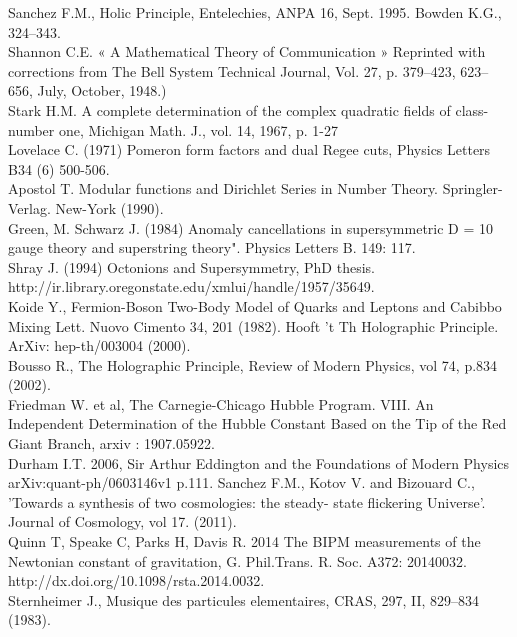 \documentclass[a4paper,9pt]{article}
\begin{document}
\begin{thebibliography}{99}
  Sanchez F.M., Holic Principle, Entelechies, ANPA 16, Sept. 1995. Bowden K.G., 324--343.\\
 Shannon C.E. « A Mathematical Theory of Communication » Reprinted with corrections from The Bell System Technical Journal, Vol. 27, p. 379–423, 623–656, July, October, 1948.)\\
 Stark H.M. A complete determination of the complex quadratic fields of class-number one, Michigan Math. J., vol. 14,‎ 1967, p. 1-27  \\
 Lovelace C. (1971) Pomeron form factors and dual Regee cuts, Physics Letters B34 (6) 500-506.\\
 Apostol T. Modular functions and Dirichlet Series in Number Theory. Springler-Verlag. New-York (1990).\\
 Green, M. Schwarz J. (1984)  Anomaly cancellations in supersymmetric D = 10 gauge theory and superstring theory". Physics Letters B. 149: 117.\\
 Shray J. (1994) Octonions and Supersymmetry, PhD thesis.  http://ir.library.oregonstate.edu/xmlui/handle/1957/35649. \\
 Koide Y., Fermion-Boson Two-Body Model of Quarks and Leptons and Cabibbo Mixing  Lett. Nuovo Cimento 34, 201 (1982). 
 Hooft 't Th Holographic Principle. ArXiv: hep-th/003004 (2000). \\
 Bousso R., The Holographic Principle, Review of Modern Physics, vol 74, p.834 (2002).\\
 Friedman W. et al, The Carnegie-Chicago Hubble Program. VIII. An Independent Determination of the Hubble Constant Based on the Tip of the Red Giant Branch, arxiv : 1907.05922.\\ 
 Durham I.T. 2006, Sir Arthur Eddington and the Foundations of Modern Physics arXiv:quant-ph/0603146v1  p.111.
 Sanchez F.M., Kotov V. and Bizouard C., 'Towards a synthesis of two cosmologies: the steady- state flickering Universe'. Journal of Cosmology, vol 17. (2011).\\
 Quinn T, Speake C, Parks H, Davis R. 2014 The BIPM measurements of the Newtonian constant of gravitation, G. Phil.Trans. R. Soc. A372: 20140032. http://dx.doi.org/10.1098/rsta.2014.0032. \\
 Sternheimer J., Musique des particules elementaires, CRAS, 297, II, 829--834 (1983).\\

\end{thebibliography}
\end{document}
